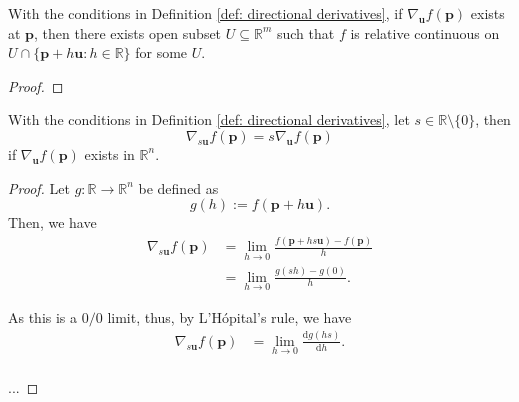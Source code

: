 \begin{lemma}
	\label{lm: direction derivative exists implies relative continuous}
	With the conditions in Definition \ref{def: directional derivatives}, if $\nabla_{\mathbf u}f(\mathbf p)$ exists at $\mathbf p$, then there exists open subset $U \subseteq \mathbb R^m$ such that $f$ is relative continuous on $U \cap \{\mathbf p + h \mathbf u : h\in \mathbb R\}$ for some $U$.
	
	\begin{proof}
		
	\end{proof}
\end{lemma}


\begin{lemma}
	With the conditions in Definition \ref{def: directional derivatives}, let $s \in \mathbb R \setminus \{0\}$, then
	$$
	\nabla_{s\mathbf u}f(\mathbf p) = s \nabla_{\mathbf u} f(\mathbf p)
	$$
	if $\nabla_{\mathbf u}f(\mathbf p)$ exists in $\mathbb R^n$.
	
	\begin{proof}
		Let $g: \mathbb R \to \mathbb R^n$ be defined as
		$$
		g(h) := f(\mathbf p + h\mathbf u).
		$$
		Then, we have
		$$
		\begin{aligned}
			\nabla_{s\mathbf u} f(\mathbf p) &= \lim_{h \to 0} \frac{f(\mathbf p + hs\mathbf u) - f(\mathbf p)}{h} \\
			&= \lim_{h \to 0} \frac{g(sh) - g(0)}{h}.
		\end{aligned}
		$$
		
		As this is a $0/0$ limit, thus, by L'H\'opital's rule, we have
		$$
		\begin{aligned}
			\nabla_{s \mathbf u} f(\mathbf p) &= \lim_{h \to 0} \frac{\mathrm dg(hs)}{\mathrm dh}. \\
		\end{aligned}
		$$
		
		...
	\end{proof}
\end{lemma}














































%